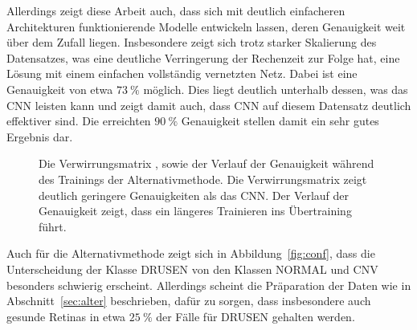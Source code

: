 %
Allerdings zeigt diese Arbeit auch, dass sich mit deutlich einfacheren
Architekturen funktionierende Modelle entwickeln lassen, deren Genauigkeit weit
über dem Zufall liegen. Insbesondere zeigt sich trotz starker Skalierung des
Datensatzes, was eine deutliche Verringerung der Rechenzeit
zur Folge hat, eine Lösung mit einem einfachen vollständig vernetzten Netz.
Dabei ist eine Genauigkeit von etwa $\SI{73}{\percent}$ möglich. Dies liegt
deutlich unterhalb dessen, was das CNN leisten kann und zeigt damit auch, dass
CNN auf diesem Datensatz deutlich effektiver sind. Die erreichten
$\SI{90}{\percent}$ Genauigkeit stellen damit ein sehr gutes Ergebnis dar.
%
\begin{figure}[h!]
  \renewcommand{\baselinestretch}{1.0}
  \caption{Die Verwirrungsmatrix \protect{}, sowie der Verlauf der Genauigkeit \protect{} während des Trainings der Alternativmethode. Die Verwirrungsmatrix zeigt deutlich geringere Genauigkeiten als das CNN. Der Verlauf der Genauigkeit zeigt, dass ein längeres Trainieren ins Übertraining führt.}
  \renewcommand{\baselinestretch}{1.5}
  \label{fig:erg}
\end{figure}
%
Auch für die Alternativmethode zeigt sich in Abbildung~\ref{fig:conf}, dass die
Unterscheidung der Klasse DRUSEN von den Klassen NORMAL und CNV besonders
schwierig erscheint. Allerdings scheint die Präparation der Daten wie in
Abschnitt~\ref{sec:alter} beschrieben, dafür zu sorgen, dass insbesondere auch
gesunde Retinas in etwa $\SI{25}{\percent}$ der Fälle für DRUSEN gehalten
werden.
